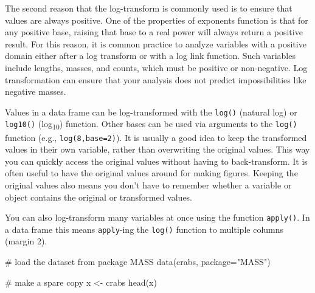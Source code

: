 \documentclass[
  13,
  letterpaper,
]{report}
\newenvironment{Shaded}{\begin{snugshade}}{\end{snugshade}}
\newcommand{\AttributeTok}[1]{\textcolor[rgb]{0.40,0.45,0.13}{#1}}
\newcommand{\CommentTok}[1]{\textcolor[rgb]{0.37,0.37,0.37}{#1}}
\newcommand{\FunctionTok}[1]{\textcolor[rgb]{0.28,0.35,0.67}{#1}}
\newcommand{\NormalTok}[1]{\textcolor[rgb]{0.00,0.23,0.31}{#1}}
\newcommand{\OtherTok}[1]{\textcolor[rgb]{0.00,0.23,0.31}{#1}}
\newcommand{\SpecialCharTok}[1]{\textcolor[rgb]{0.37,0.37,0.37}{#1}}
\newcommand{\StringTok}[1]{\textcolor[rgb]{0.13,0.47,0.30}{#1}}
\begin{document}
The second reason that the log-transform is commonly used is to ensure
that values are always positive. One of the properties of exponents
function is that for any positive base, raising that base to a real
power will always return a positive result. For this reason, it is
common practice to analyze variables with a positive domain either after
a log transform or with a log link function. Such variables include
lengths, masses, and counts, which must be positive or non-negative. Log
transformation can ensure that your analysis does not predict
impossibilities like negative masses.

Values in a data frame can be log-transformed with the \texttt{log()}
(natural log) or \texttt{log10()} (log\textsubscript{10}) function.
Other bases can be used via arguments to the \texttt{log()} function
(e.g., \texttt{log(8,base=2)}). It is usually a good idea to keep the
transformed values in their own variable, rather than overwriting the
original values. This way you can quickly access the original values
without having to back-transform. It is often useful to have the
original values around for making figures. Keeping the original values
also means you don't have to remember whether a variable or object
contains the original or transformed values.

\begin{Shaded}
\end{Shaded}

You can also log-transform many variables at once using the function
\texttt{apply()}. In a data frame this means \texttt{apply}-ing the
\texttt{log()} function to multiple columns (margin 2).

\begin{Shaded}
\begin{Highlighting}[]
\CommentTok{\# load the dataset from package MASS}
\FunctionTok{data}\NormalTok{(crabs, }\AttributeTok{package=}\StringTok{"MASS"}\NormalTok{)}

\CommentTok{\# make a spare copy}
\NormalTok{x }\OtherTok{\textless{}{-}}\NormalTok{ crabs}
\FunctionTok{head}\NormalTok{(x)}
\end{Highlighting}
\end{Shaded}
\end{document}
